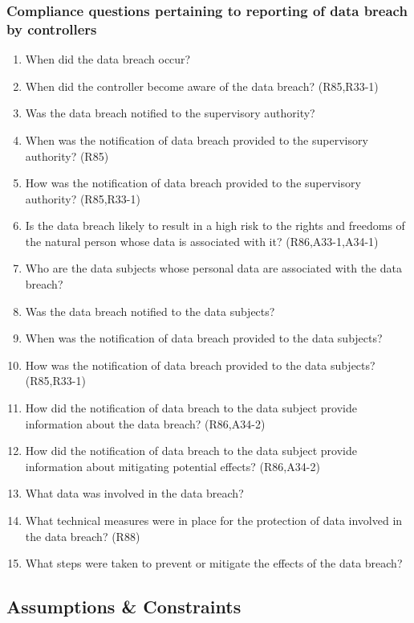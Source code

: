 \subsubsection{Compliance questions pertaining to reporting of data breach by controllers}
\begin{enumerate}[label={\textit{CMQ.\theenumi}},resume]
    \item When did the data breach occur?
    \item When did the controller become aware of the data breach? (R85,R33-1)
    \item Was the data breach notified to the supervisory authority?
    \item When was the notification of data breach provided to the supervisory authority? (R85)
    \item How was the notification of data breach provided to the supervisory authority? (R85,R33-1)
    \item Is the data breach likely to result in a high risk to the rights and freedoms of the natural person whose data is associated with it? (R86,A33-1,A34-1)
    \item Who are the data subjects whose personal data are associated with the data breach?
    \item Was the data breach notified to the data subjects?
    \item When was the notification of data breach provided to the data subjects?
    \item How was the notification of data breach provided to the data subjects? (R85,R33-1)
    \item How did the notification of data breach to the data subject provide information about the data breach? (R86,A34-2)
    \item How did the notification of data breach to the data subject provide information about mitigating potential effects? (R86,A34-2)
    \item What data was involved in the data breach?
    \item What technical measures were in place for the protection of data involved in the data breach? (R88)
    \item What steps were taken to prevent or mitigate the effects of the data breach?
\end{enumerate}

\subsection{Assumptions \& Constraints}\label{sec:info:constraints}

